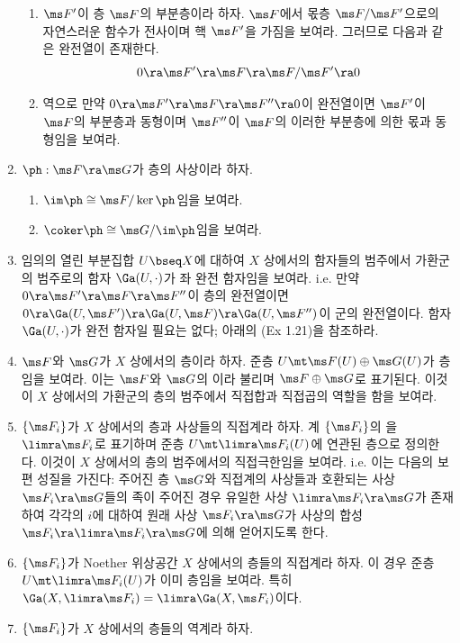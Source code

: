 \begin{enumerate}[label=\tb{1.\arabic*.},itemindent=0mm,itemsep=2mm]
\begin{enumerate}[label=(\alph*)]
	\item $\ms F'$이 층 $\ms F$의 부분층이라 하자. $\ms F$에서 몫층 $\ms F/\ms F'$으로의 자연스러운 함수가
	전사이며 핵 $\ms F'$을 가짐을 보여라. 그러므로 다음과 같은 완전열이 존재한다.
	$$0\ra\ms F'\ra\ms F\ra\ms F/\ms F'\ra 0$$
	\item 역으로 만약 $0\ra\ms F'\ra\ms F\ra\ms F''\ra 0$이 완전열이면 $\ms F'$이 $\ms F$의 부분층과 동형이며
	$\ms F''$이 $\ms F$의 이러한 부분층에 의한 몫과 동형임을 보여라.
	\end{enumerate}
	\item $\ph:\ms F\ra\ms G$가 층의 사상이라 하자.
	\begin{enumerate}[label=(\alph*)]
	\item $\im\ph\cong\ms F/\ker\ph$임을 보여라.
	\item $\coker\ph\cong\ms G/\im\ph$임을 보여라.
	\end{enumerate}
	\item 임의의 열린 부분집합 $U\bseq X$에 대하여 $X$ 상에서의 함자들의 범주에서 가환군의 범주로의 함자 $\Ga(U,\cdot)$가
	좌 완전 함자임을 보여라. i.e. 만약 $0\ra\ms F'\ra\ms F\ra\ms F''$이 층의 완전열이면
	$0\ra\Ga(U,\ms F')\ra\Ga(U,\ms F)\ra\Ga(U,\ms F'')$이 군의 완전열이다.
	함자 $\Ga(U,\cdot)$가 완전 함자일 필요는 없다; 아래의 (Ex 1.21)을 참조하라.
	\item {} $\ms F$와 $\ms G$가 $X$ 상에서의 층이라 하자. 준층 $U\mt\ms F(U)\oplus\ms G(U)$가 층임을 보여라.
	이는 $\ms F$와 $\ms G$의 이라 불리며 $\ms F\oplus\ms G$로 표기된다.
	이것이 $X$ 상에서의 가환군의 층의 범주에서 직접합과 직접곱의 역할을 함을 보여라.
	\item {} $\{\ms F_i\}$가 $X$ 상에서의 층과 사상들의 직접계라 하자.
	계 $\{\ms F_i\}$의 을 $\limra\ms F_i$로 표기하며
	준층 $U\mt\limra\ms F_i(U)$에 연관된 층으로 정의한다.
	이것이 $X$ 상에서의 층의 범주에서의 직접극한임을 보여라. i.e. 이는 다음의 보편 성질을 가진다:
	주어진 층 $\ms G$와 직접계의 사상들과 호환되는 사상 $\ms F_i\ra\ms G$들의 족이 주어진 경우
	유일한 사상 $\limra\ms F_i\ra\ms G$가 존재하여 각각의 $i$에 대하여 원래 사상 $\ms F_i\ra\ms G$가
	사상의 합성 $\ms F_i\ra\limra\ms F_i\ra\ms G$에 의해 얻어지도록 한다.
	\item $\{\ms F_i\}$가 Noether 위상공간 $X$ 상에서의 층들의 직접계라 하자.
	이 경우 준층 $U\mt\limra\ms F_i(U)$가 이미 층임을 보여라. 특히 $\Ga(X,\limra\ms F_i)=\limra\Ga(X,\ms F_i)$이다.
	\item {} $\{\ms F_i\}$가 $X$ 상에서의 층들의 역계라 하자.

\end{enumerate}
